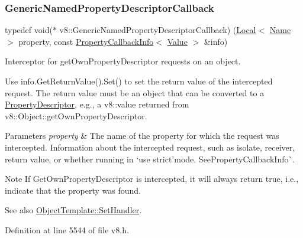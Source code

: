 \mbox{\label{namespacev8_a8cf8faa26baffa84173a24906c0d49f6}} 
\subsubsection{\texorpdfstring{Generic\+Named\+Property\+Descriptor\+Callback}{GenericNamedPropertyDescriptorCallback}}
{\footnotesize\ttfamily typedef void($\ast$ v8\+::\+Generic\+Named\+Property\+Descriptor\+Callback) (\mbox{\hyperlink{classv8_1_1Local}{Local}}$<$ \mbox{\hyperlink{classv8_1_1Name}{Name}} $>$ property, const \mbox{\hyperlink{classv8_1_1PropertyCallbackInfo}{Property\+Callback\+Info}}$<$ \mbox{\hyperlink{classv8_1_1Value}{Value}} $>$ \&info)}

Interceptor for get\+Own\+Property\+Descriptor requests on an object.

Use {\ttfamily info.\+Get\+Return\+Value().Set()} to set the return value of the intercepted request. The return value must be an object that can be converted to a \mbox{\hyperlink{classv8_1_1PropertyDescriptor}{Property\+Descriptor}}, e.\+g., a {\ttfamily v8\+::value} returned from {\ttfamily v8\+::\+Object\+::get\+Own\+Property\+Descriptor}.


\begin{DoxyParams}{Parameters}
{\em property} & The name of the property for which the request was intercepted.  Information about the intercepted request, such as isolate, receiver, return value, or whether running in `\textquotesingle{}use strict'{\ttfamily mode. See}Property\+Callback\+Info\`{}.\\
\hline
\end{DoxyParams}
\begin{DoxyNote}{Note}
If Get\+Own\+Property\+Descriptor is intercepted, it will always return true, i.\+e., indicate that the property was found.
\end{DoxyNote}
See also {\ttfamily \mbox{\hyperlink{classv8_1_1ObjectTemplate_a3d5666f1e9b0f46df6b4dbb7cfbb6114}{Object\+Template\+::\+Set\+Handler}}}. 

Definition at line 5544 of file v8.\+h.

\mbox{\label{namespacev8_a20826eb7e52e84fa4f632534e8eddd04}} 
